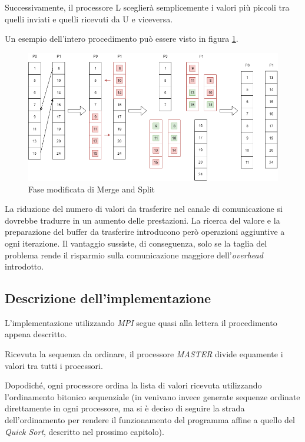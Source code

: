 Successivamente, il processore L sceglierà semplicemente i valori più piccoli tra quelli inviati e quelli ricevuti da U e viceversa.

Un esempio dell'intero procedimento può essere visto in figura \ref{mergeAndSplit}.

\begin{figure}[h!]
  \centering
  \includegraphics[width=\linewidth]{Images/mergeAndSplit.png}
  \caption{Fase modificata di Merge and Split}
  \label{mergeAndSplit}
\end{figure}

La riduzione del numero di valori da trasferire nel canale di comunicazione si dovrebbe tradurre in un aumento delle prestazioni. La ricerca del valore e la preparazione del buffer da trasferire introducono però operazioni aggiuntive a ogni iterazione. Il vantaggio sussiste, di conseguenza, solo se la taglia del problema rende il risparmio sulla comunicazione maggiore dell'\textit{overhead} introdotto.

\subsection{Descrizione dell'implementazione}

L'implementazione utilizzando \textit{MPI} segue quasi alla lettera il procedimento appena descritto.

Ricevuta la sequenza da ordinare, il processore \textit{MASTER} divide equamente i valori tra tutti i processori.

Dopodiché, ogni processore ordina la lista di valori ricevuta utilizzando l'ordinamento bitonico sequenziale (in \cite{PaperBitonic} venivano invece generate sequenze ordinate direttamente in ogni processore, ma si è deciso di seguire la strada dell'ordinamento per rendere il funzionamento del programma affine a quello del \textit{Quick Sort}, descritto nel prossimo capitolo).

